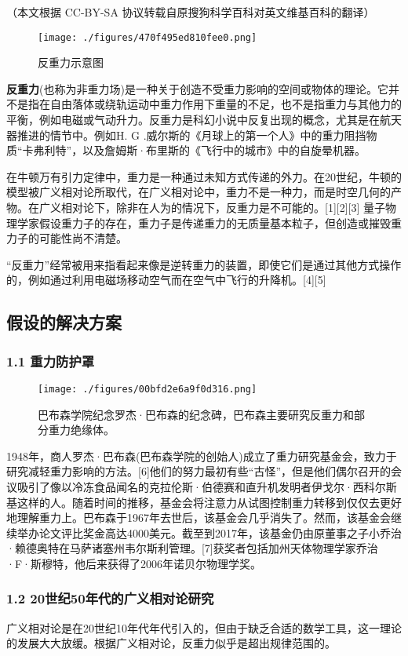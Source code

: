 
（本文根据 CC-BY-SA 协议转载自原搜狗科学百科对英文维基百科的翻译）

\begin{figure}[ht]
\centering
\texttt{[image: ./figures/470f495ed810fee0.png]}
\caption{反重力示意图} \label{fig_FZL_1}
\end{figure}
\textbf{反重力}(也称为非重力场)是一种关于创造不受重力影响的空间或物体的理论。它并不是指在自由落体或绕轨运动中重力作用下重量的不足，也不是指重力与其他力的平衡，例如电磁或气动升力。反重力是科幻小说中反复出现的概念，尤其是在航天器推进的情节中。例如H. G .威尔斯的《月球上的第一个人》中的重力阻挡物质“卡弗利特”，以及詹姆斯·布里斯的《飞行中的城市》中的自旋晕机器。

在牛顿万有引力定律中，重力是一种通过未知方式传递的外力。在20世纪，牛顿的模型被广义相对论所取代，在广义相对论中，重力不是一种力，而是时空几何的产物。在广义相对论下，除非在人为的情况下，反重力是不可能的。[1][2][3] 量子物理学家假设重力子的存在，重力子是传递重力的无质量基本粒子，但创造或摧毁重力子的可能性尚不清楚。

“反重力”经常被用来指看起来像是逆转重力的装置，即使它们是通过其他方式操作的，例如通过利用电磁场移动空气而在空气中飞行的升降机。[4][5]
\subsection{假设的解决方案}
\subsubsection{1.1 重力防护罩}
\begin{figure}[ht]
\centering
\texttt{[image: ./figures/00bfd2e6a9f0d316.png]}
\caption{巴布森学院纪念罗杰·巴布森的纪念碑，巴布森主要研究反重力和部分重力绝缘体。} \label{fig_FZL_2}
\end{figure}
1948年，商人罗杰·巴布森(巴布森学院的创始人)成立了重力研究基金会，致力于研究减轻重力影响的方法。[6]他们的努力最初有些“古怪”，但是他们偶尔召开的会议吸引了像以冷冻食品闻名的克拉伦斯·伯德赛和直升机发明者伊戈尔·西科尔斯基这样的人。随着时间的推移，基金会将注意力从试图控制重力转移到仅仅去更好地理解重力上。巴布森于1967年去世后，该基金会几乎消失了。然而，该基金会继续举办论文评比奖金高达4000美元。截至到2017年，该基金仍由原董事之子小乔治·赖德奥特在马萨诸塞州韦尔斯利管理。[7]获奖者包括加州天体物理学家乔治·F·斯穆特，他后来获得了2006年诺贝尔物理学奖。
\subsubsection{1.2 20世纪50年代的广义相对论研究}
广义相对论是在20世纪10年代年代引入的，但由于缺乏合适的数学工具，这一理论的发展大大放缓。根据广义相对论，反重力似乎是超出规律范围的。

